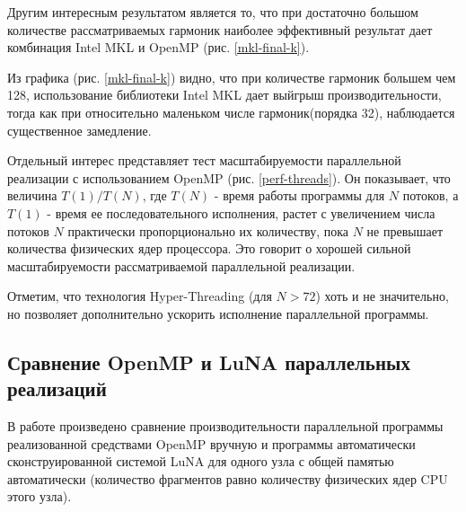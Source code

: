 Другим интересным результатом является то, что при достаточно большом количестве рассматриваемых гармоник
наиболее эффективный результат дает комбинация Intel MKL и OpenMP (рис. \ref{mkl-final-k}).

Из графика (рис. \ref{mkl-final-k}) видно, что при количестве гармоник большем чем 128, использование библиотеки Intel MKL
дает выйгрыш производительности, тогда как при относительно маленьком числе гармоник(порядка 32), наблюдается существенное замедление.


Отдельный интерес представляет тест масштабируемости параллельной реализации с использованием OpenMP (рис. \ref{perf-threads}).
Он показывает, что величина $T(1)/T(N)$, где $T(N)$ - время работы программы для $N$ потоков, а $T(1)$ - время ее последовательного исполнения, растет с увеличением числа потоков $N$ практически пропорционально их количеству, пока $N$ не превышает количества физических ядер процессора. Это говорит о хорошей сильной масштабируемости рассматриваемой параллельной реализации.


Отметим, что технология Hyper-Threading (для $N>72$) хоть и не значительно, но позволяет дополнительно ускорить исполнение параллельной программы.

\subsection{Сравнение OpenMP и LuNA параллельных реализаций}
В работе произведено сравнение производительности параллельной программы реализованной средствами OpenMP вручную
и программы автоматически сконструированной системой LuNA для одного узла с общей памятью автоматически (количество фрагментов
равно количеству физических ядер CPU этого узла).

